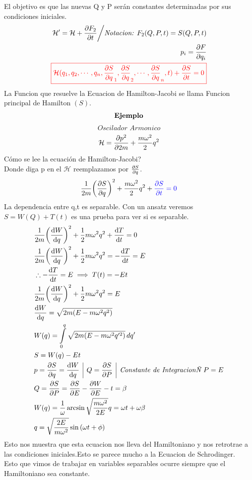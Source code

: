 \documentclass[12pt]{article}
\newcommand{\eq}[1]{\[#1\]}
\renewcommand{\H}{\mathcal{H}}
\newcommand{\sinn}[1]{\sin{\qty(#1)}}
\newcommand{\inv}[1]{\frac{1}{#1}}
\newcommand{\intt}[2]{\int\limits_{#1}^{#2}}
\newcommand{\xn}[1]{{#1}_{1},{#1}_{2},\cdots,{#1}_{n}}
\newcommand{\ej}{\[\textrm{\textbf{Ejemplo}} \]}
\newcommand{\vl}{\,\,\, \vline \,\,\,}
\newcommand{\rojo}[1]{{\color{rojo}#1}}
\newcommand{\azulf}[1]{{\color{azul_fosfo}#1}}
\begin{document}
El objetivo es que las nuevas Q y P serán constantes determinadas por sus condiciones iniciales.\\
\begin{align}
\H'= \H + \pdv{F_2}{t}\bigg/\textit{Notacion: }F_2(Q,P,t) = S(Q,P,t)\\
	p_i = \pdv{F}{q_i}\\
\rojo{\boxed{\H(\xn{q},\xn{\pdv{S}{q}},t) +\pdv{S}{t}=0}}
\end{align}
La Funcion que resuelve la Ecuacion de Hamilton-Jacobi se llama Funcion principal de Hamilton $(S)$.
\newpage
\ej
\eq{\textit{Oscilador Armonico}}
\begin{align}
\H = \pdv{p^2}{2m} + \frac{m\omega^2}{2}q^2
\end{align}
Cómo se lee la ecuación de Hamilton-Jacobi?\\
Donde diga p en el $\H$ reemplazamos por $\pdv{S}{q}$. \\
\begin{align}
\inv{2m}\qty(\pdv{S}{q})^2 + 	\frac{m\omega^2}{2}q^2 + \azulf{\pdv{S}{t}=0}
\end{align}
La dependencia entre q,t es separable. Con un ansatz veremos $S=W(Q)+T(t)$ es una prueba para ver si es separable.
\begin{align}
&\inv{2m} \qty(\dv{W}{q})^2 + \inv{2} m\omega^2 q^2 +\dv{T}{t}=0\\
&\inv{2m} \qty(\dv{W}{q})^2 + \inv{2} m\omega^2 q^2 =-\dv{T}{t}= E\\
&\therefore -\dv{T}{t}= E \implies T(t)=-Et\\
&\inv{2m} \qty(\dv{W}{q})^2 + \inv{2} m\omega^2 q^2=E\\
&\dv{W}{q}= \sqrt{2m\qty(E-m\omega^2 q^2)}\\
&W(q)=\intt{0}{q} \sqrt{2m\qty(E-m\omega^2 q'^2)}\, dq'\\
&S= W(q)-Et\\
&p=\pdv{S}{q}=\dv{W}{q}\vl Q=\pdv{S}{P} \vl \textit{Constante de IntegracionÑ }P=E\\
&Q=\pdv{S}{P}=\pdv{S}{E}- \pdv{W}{E}-t=\beta\\
&W(q)= \inv{\omega} \arcsin{\sqrt{\frac{m \omega^2}{2E}}q} = \omega t +\omega \beta\\
&q= \sqrt{\frac{2E}{m \omega^2}} \sinn{\omega t +\phi}
\end{align}
Esto nos muestra que esta ecuacion nos lleva del Hamiltoniano y nos retrotrae a las condiciones iniciales.Esto se parece mucho a la Ecuacion de Schrodinger.\\
Esto que vimos de trabajar en variables separables ocurre siempre que el Hamiltoniano sea constante.
\end{document}
